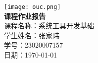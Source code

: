 \documentclass[a4paper,12pt]{report} %
\begin{document}
\pagestyle{empty}
\begin{titlepage}
    \centering
    \vspace*{2cm}
    \texttt{[image: ouc.png]}\\
    \vspace{1cm}
    {\Huge \textbf{课程作业报告}}\\[1.5cm]
    {\Large 课程名称：系统工具开发基础}\\[1cm]
    {\Large 学生姓名：张家玮}\\[1cm]
    {\Large 学号：23020007157}\\[1cm]
    {\Large 日期：\today}
    \vfill
\end{titlepage}

\tableofcontents
\newpage

\pagestyle{plain}
\chapter{}
\end{document}
